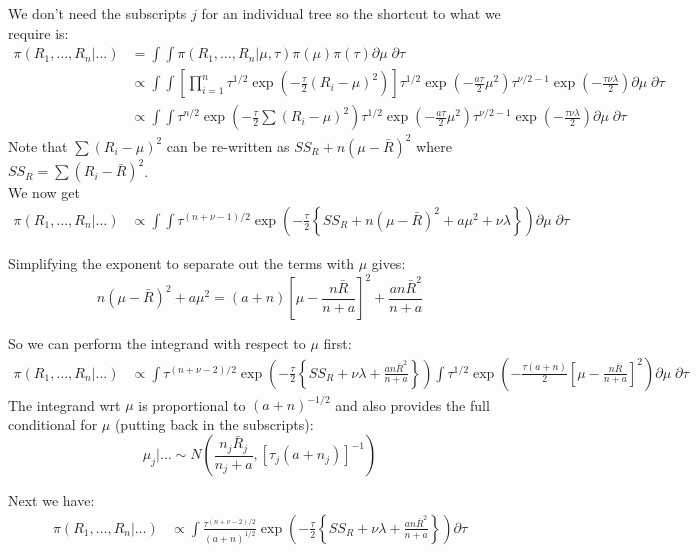 \documentclass{article}
\begin{document}
We don't need the subscripts $j$ for an individual tree so the shortcut to what we require is:
\begin{align*}
\pi(R_1, \ldots, R_n| \ldots ) &= \int \int \pi(R_1, \ldots, R_n| \mu, \tau) \pi(\mu) \pi(\tau) \partial \mu \; \partial \tau \\
&\propto \int \int \left[ \prod_{i=1}^n \tau^{1/2} \exp \left(-\frac{\tau}{2} (R_i - \mu)^2 \right) \right]\tau^{1/2} \exp \left(-\frac{a \tau}{2} \mu^2 \right) \tau^{\nu/2 - 1} \exp \left( - \frac{\tau \nu \lambda} {2} \right) \partial \mu \; \partial \tau \\
&\propto \int \int \tau^{n/2} \exp \left(-\frac{\tau}{2} \sum (R_i - \mu)^2 \right) \tau^{1/2} \exp \left(-\frac{a \tau}{2} \mu^2 \right) \tau^{\nu/2 - 1} \exp \left( - \frac{\tau \nu \lambda} {2} \right) \partial \mu \; \partial \tau 
\end{align*}
Note that $\sum (R_i - \mu)^2$ can be re-written as $SS_{R} + n(\mu - \bar{R})^2$ where $SS_R = \sum (R_i - \bar{R})^2$.\\

We now get
\begin{align*}
\pi(R_1, \ldots, R_n| \ldots ) &\propto \int \int  \tau^{(n+\nu - 1)/2} \exp \left(-\frac{\tau}{2} \left\{ SS_{R} + n(\mu - \bar{R})^2  + a \mu^2 + \nu \lambda \right\} \right) \partial \mu \; \partial \tau
\end{align*}

Simplifying the exponent to separate out the terms with $\mu$ gives:
$$n(\mu - \bar{R})^2 + a \mu^2 = (a+n)\left[ \mu - \frac{n\bar{R}}{n + a} \right]^2 + \frac{a n\bar{R}^2}{n + a}$$

So we can perform the integrand with respect to $\mu$ first:
\begin{align*}
\pi(R_1, \ldots, R_n| \ldots ) &\propto  \int  \tau^{(n+\nu - 2)/2} \exp \left(-\frac{\tau}{2} \left\{ SS_{R} + \nu \lambda + \frac{an\bar{R}^2}{n + a} \right\} \right) \int \tau^{1/2} \exp \left(-\frac{\tau (a+n)}{2} \left[ \mu - \frac{n\bar{R}}{n + a} \right]^2  \right) \partial \mu \; \partial \tau
\end{align*}
The integrand wrt $\mu$ is proportional to $(a + n)^{-1/2}$ and also provides the full conditional for $\mu$ (putting back in the subscripts):
$$\mu_j |\ldots \sim N \left( \frac{n_j\bar{R}_j}{n_j + a} , \left[ \tau_j (a+n_j) \right]^{-1} \right)$$

Next we have: 
\begin{align*}
\pi(R_1, \ldots, R_n| \ldots ) &\propto  \int  \frac{\tau^{(n+\nu - 2)/2}}{(a+n)^{1/2}} \exp \left(-\frac{\tau}{2} \left\{ SS_{R} + \nu \lambda + \frac{an\bar{R}^2}{n + a} \right\} \right)  \partial \tau
\end{align*}
\end{document}
